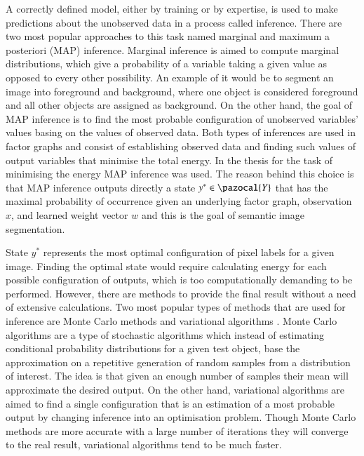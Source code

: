 A correctly defined model, either by training or by expertise, is used to make predictions about the unobserved data in a process called inference. There are two most popular approaches to this task named marginal and maximum a posteriori (MAP) inference. Marginal inference is aimed to compute marginal distributions, which give a probability of a variable taking a given value as opposed to every other possibility. An example of it would be to segment an image into foreground and background, where one object is considered foreground and all other objects are assigned as background. On the other hand, the goal of MAP inference is to find the most probable configuration of unobserved variables’ values basing on the values of observed data. Both types of inferences are used in factor graphs and consist of establishing observed data and finding such values of output variables that minimise the total energy. In the thesis for the task of minimising the energy MAP inference was used. The reason behind this choice is that MAP inference outputs directly a state $y^* \in \pazocal{Y}$ that has the maximal probability of occurrence given an underlying factor graph, observation $x$, and learned weight vector $w$ and this is the goal of semantic image segmentation. 

State $y^*$ represents the most optimal configuration of pixel labels for a given image. Finding the optimal state would require calculating energy for each possible configuration of outputs, which is too computationally demanding to be performed. However, there are methods to provide the final result without a need of extensive calculations. Two most popular types of methods that are used for inference are Monte Carlo methods and variational algorithms \cite{crf_sutton}. Monte Carlo algorithms are a type of stochastic algorithms which instead of estimating conditional probability distributions for a given test object, base the approximation on a repetitive generation of random samples from a distribution of interest. The idea is that given an enough number of samples their mean will approximate the desired output. On the other hand, variational algorithms are aimed to find a single configuration that is an estimation of a most probable output by changing inference into an optimisation problem. Though Monte Carlo methods are more accurate with a large number of iterations they will converge to the real result, variational algorithms tend to be much faster. 

